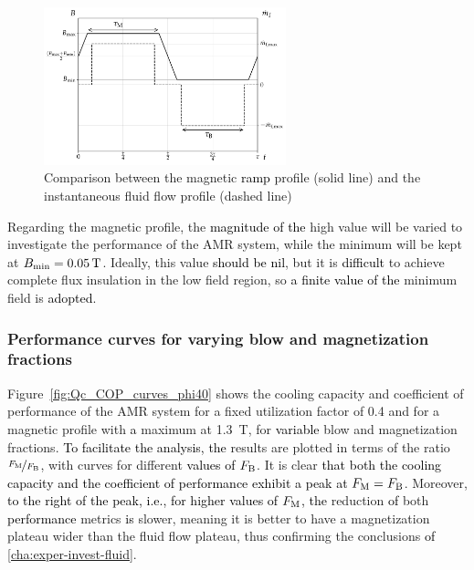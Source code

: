 \documentclass[referee]{svjour3}
\newcommand{\bmin}{\ensuremath{{B}\ped{min}}}
\begin{document}
\begin{figure}[!ht]
  \centering
  \includegraphics[width=7cm]{profiles_rm_and_flow_instantaneous}
  \caption{Comparison between the magnetic \textcolor{black}{ramp} profile (solid line) and the instantaneous fluid flow profile (dashed line)}
  \label{fig:ramp-inst}
\end{figure}
 

Regarding the magnetic profile, the \textcolor{black}{magnitude of the} high value will be varied to investigate the performance of the AMR system, while the minimum will be kept at $\bmin = \SI{0.05}{\tesla}$. Ideally, this value \textcolor{black}{should be nil}, but it is \textcolor{black}{difficult} to achieve complete flux insulation in the low field region, so \textcolor{black}{a finite value of the} minimum field is \textcolor{black}{adopted}.

\subsubsection{Performance curves for varying blow and magnetization fractions}
\label{sec:perf-curv-vary}

Figure~\ref{fig:Qc_COP_curves_phi40} shows the cooling capacity and coefficient of performance of the AMR system for a fixed utilization factor of \num{0.4} and for a magnetic profile with \textcolor{black}{a} maximum at \SI{1.3}{\tesla}, for \textcolor{black}{variable} blow and magnetization fractions. \textcolor{black}{To facilitate the analysis, the} results are plotted in terms of the ratio $\nicefrac{F_{\mathrm{M}}}{F_{\mathrm{B}}}$, with curves for different \textcolor{black}{values of} $F_{\mathrm{B}}$. It is clear \textcolor{black}{that both the cooling capacity and the coefficient of performance exhibit a peak at} $F_{\mathrm{M}} = F_{\mathrm{B}}$. Moreover,  \textcolor{black}{to the right of the peak, i.e., for higher values of $F_{\mathrm{M}}$, the}  reduction \textcolor{black}{of} both \textcolor{black}{performance} metrics \textcolor{black}{is} slower, meaning it is better to have a magnetization plateau wider than the fluid flow plateau, thus confirming the conclusions \textcolor{black}{of} \autoref{cha:exper-invest-fluid}. 
\end{document}
